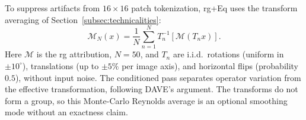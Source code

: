 To suppress artifacts from $16{\times}16$ patch tokenization, \ac{rg}+Eq uses the transform averaging of Section~\ref{subsec:technicalities}:
\begin{equation}\label{ptnb:eq:equivariant-average}
    \mathcal M_N(x)=\frac1N\sum_{n=1}^N T_n^{-1}[\mathcal M(T_nx)].
\end{equation}
Here $\mathcal M$ is the \ac{rg} attribution, $N=50$, and $T_n$ are i.i.d.\ rotations (uniform in $\pm10^\circ$), translations (up to $\pm5\%$ per image axis), and horizontal flips (probability $0.5$), without input noise. The conditioned pass separates operator variation from the effective transformation, following DAVE's argument. The transforms do not form a group, so this Monte-Carlo Reynolds average is an optional smoothing mode without an exactness claim.

